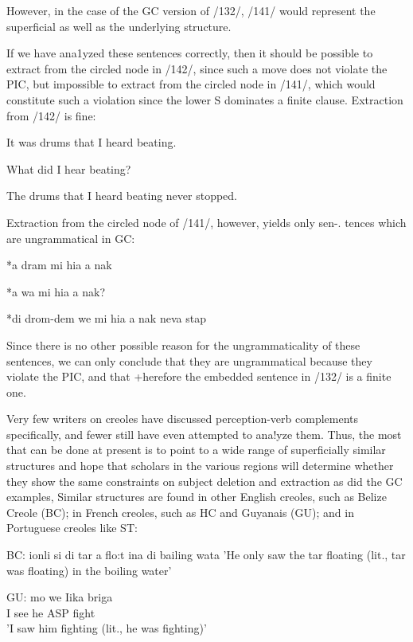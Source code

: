 However, in the case of the GC version of /132/, /141/ would represent the superficial as well as the underlying structure.

If we have ana1yzed these sentences correctly, then it should be
possible to extract from the circled node in /142/, since such a move does not violate the PIC, but impossible to extract from the circled node in /141/, which would constitute such a violation since the lower S dominates a finite clause. Extraction from /142/ is fine:

\ea\label{ex:143}
 It was drums that I heard beating.
\z

\ea\label{ex:144}
 What did I hear beating?
\z

\ea\label{ex:145}
 The drums that I heard beating never stopped.
\z

Extraction from the circled node of /141/, however, yields only sen{}-. tences which are ungrammatical in GC:

\ea\label{ex:146}
 *a dram mi hia a nak
\z

\ea\label{ex:147}
 *a wa mi hia a nak?
\z

\ea\label{ex:148}
 *di drom-dem we mi hia a nak neva stap
\z

Since there is no other possible reason for the ungrammaticality of these sentences, we can only conclude that they are ungrammatical because they violate the PIC, and that +herefore the embedded sentence in /132/ is a finite one.


Very few writers on creoles have discussed perception-verb com\-plements specifically, and fewer still have even attempted to ana!yze them. Thus, the most that can be done at present is to point to a wide range of superficially similar structures and hope that scholars in the various regions will determine whether they show the same constraints on subject deletion and extraction as did the GC examples, Similar structures are found in other English creoles, such as Belize Creole (BC); in French creoles, such as HC and Guyanais (GU); and in Portu\-guese creoles like ST:

\ea\label{ex:149}
 BC: ionli si di tar a flo:t ina di bailing wata
\glt 'He only saw the tar floating (lit., tar was floating) in the boiling water'
\z



\ea\label{ex:150}
 \gll GU: mo we Iika briga\\
I see he ASP fight\\
\glt 'I saw him fighting (lit., he was fighting)'
\z





